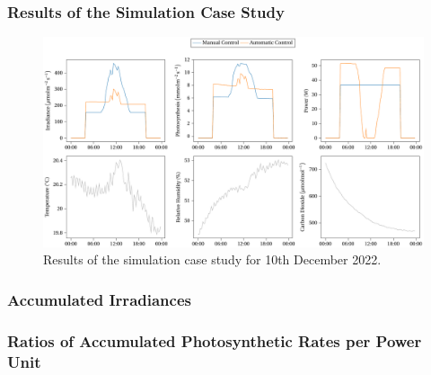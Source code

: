 \begin{frame}
    \frametitle{Results of the Simulation Case Study}
    \begin{figure}
        \centering
        \includegraphics[scale=0.3]{figures/casestudy.pdf}
        \caption{Results of the simulation case study for 10th December 2022.}
    \end{figure}
\end{frame}

\begin{frame}
    \frametitle{Accumulated Irradiances}
    \begin{table}
        \centering
        \caption{Accumulated irradiances $\left(\mathrm{mol} \, \mathrm{m}^{-2} \, \mathrm{d}^{-1}\right)$}
    \end{table}
\end{frame}

\begin{frame}
    \frametitle{\large Ratios of Accumulated Photosynthetic Rates per Power Unit}
    \begin{table}
        \centering
        \caption{Ratios of accumulated photosynthetic rates per power unit $\left(\mathrm{mmol} \, \mathrm{m}^{-2} \, \mathrm{d}^{-1} \; \slash \; \mathrm{kWh}\right)$}
    \end{table}
\end{frame}